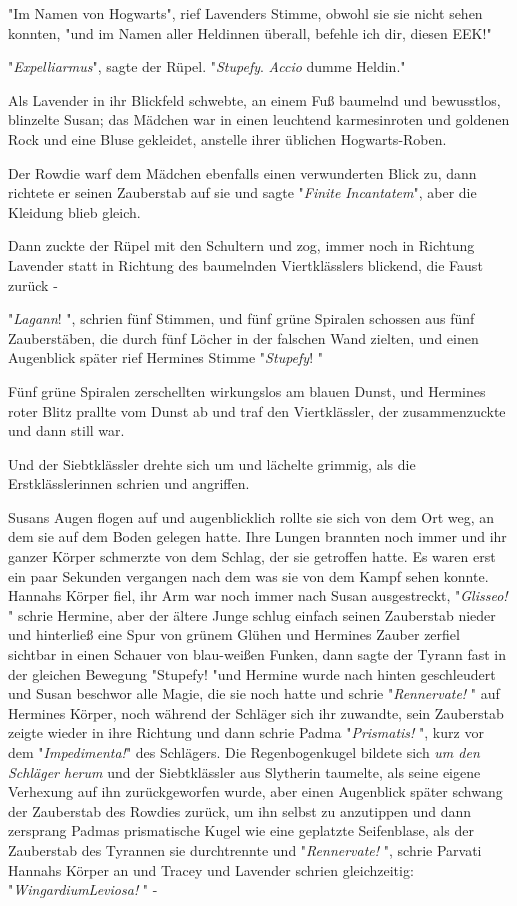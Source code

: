 {"Im Namen von Hogwarts", rief Lavenders Stimme, obwohl sie sie nicht sehen konnten, "und im Namen aller Heldinnen überall, befehle ich dir, diesen EEK!"

"\emph{Expelliarmus}", sagte der Rüpel. "\emph{Stupefy}. \emph{Accio} dumme Heldin."

Als Lavender in ihr Blickfeld schwebte, an einem Fuß baumelnd und bewusstlos, blinzelte Susan; das Mädchen war in einen leuchtend karmesinroten und goldenen Rock und eine Bluse gekleidet, anstelle ihrer üblichen Hogwarts-Roben.

Der Rowdie warf dem Mädchen ebenfalls einen verwunderten Blick zu, dann richtete er seinen Zauberstab auf sie und sagte "\emph{Finite} \emph{Incantatem}", aber die Kleidung blieb gleich.

Dann zuckte der Rüpel mit den Schultern und zog, immer noch in Richtung Lavender statt in Richtung des baumelnden Viertklässlers blickend, die Faust zurück -

"\emph{Lagann}! ", schrien fünf Stimmen, und fünf grüne Spiralen schossen aus fünf Zauberstäben, die durch fünf Löcher in der falschen Wand zielten, und einen Augenblick später rief Hermines Stimme "\emph{Stupefy}! "

Fünf grüne Spiralen zerschellten wirkungslos am blauen Dunst, und Hermines roter Blitz prallte vom Dunst ab und traf den Viertklässler, der zusammenzuckte und dann still war.

Und der Siebtklässler drehte sich um und lächelte grimmig, als die Erstklässlerinnen schrien und angriffen.

Susans Augen flogen auf und augenblicklich rollte sie sich von dem Ort weg, an dem sie auf dem Boden gelegen hatte. Ihre Lungen brannten noch immer und ihr ganzer Körper schmerzte von dem Schlag, der sie getroffen hatte. Es waren erst ein paar Sekunden vergangen nach dem was sie von dem Kampf sehen konnte. Hannahs Körper fiel, ihr Arm war noch immer nach Susan ausgestreckt, "\emph{Glisseo!} " schrie Hermine, aber der ältere Junge schlug einfach seinen Zauberstab nieder und hinterließ eine Spur von grünem Glühen und Hermines Zauber zerfiel sichtbar in einen Schauer von blau-weißen Funken, dann sagte der Tyrann fast in der gleichen Bewegung "Stupefy! "und Hermine wurde nach hinten geschleudert und Susan beschwor alle Magie, die sie noch hatte und schrie "\emph{Rennervate!} " auf Hermines Körper, noch während der Schläger sich ihr zuwandte, sein Zauberstab zeigte wieder in ihre Richtung und dann schrie Padma "\emph{Prismatis!} ", kurz vor dem "\emph{Impedimenta!}" des Schlägers. Die Regenbogenkugel bildete sich \emph{um den} \emph{Schläger herum} und der Siebtklässler aus Slytherin taumelte, als seine eigene Verhexung auf ihn zurückgeworfen wurde, aber einen Augenblick später schwang der Zauberstab des Rowdies zurück, um ihn selbst zu anzutippen und dann zersprang Padmas prismatische Kugel wie eine geplatzte Seifenblase, als der Zauberstab des Tyrannen sie durchtrennte und "\emph{Rennervate!} ", schrie Parvati Hannahs Körper an und Tracey und Lavender schrien gleichzeitig: "\emph{WingardiumLeviosa!} " -

}
